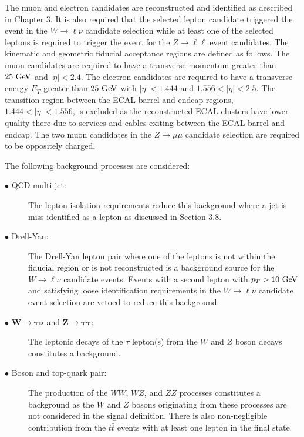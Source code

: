 The muon and electron candidates are reconstructed and identified as described in Chapter 3. It is also required that the selected lepton candidate triggered the event in the $W\rightarrow \ell\nu$ candidate selection while at least one of the selected leptons is required to trigger the event for the $Z\rightarrow \ell\ell$ event candidates. The kinematic and geometric fiducial acceptance regions are defined as follows. The muon candidates are required to have a transverse momentum greater than $25~\mathrm{Ge\kern -0.1em V}$ and $|\eta|<2.4$. The electron candidates are required to have a transverse energy $E_{T}$ greater than $25~\mathrm{Ge\kern -0.1em V}$ with $|\eta|<1.444$ and $1.556<|\eta|<2.5$.  The transition region between the ECAL barrel and endcap regions, $1.444<|\eta|<1.556$, is excluded as the reconstructed ECAL clusters have lower quality there due to services and cables exiting between the ECAL barrel and endcap. The two muon candidates in the  $Z\rightarrow \mu\mu$ candidate selection are required to be oppositely charged.

The following background processes are considered:
\begin{description}
\item[$\bullet$ QCD multi-jet:] The lepton isolation requirements reduce this background where a jet is miss-identified as a lepton as discussed in Section 3.8.  
\item[$\bullet$ Drell-Yan:] The Drell-Yan lepton pair where one of the leptons is not within the fiducial region or is not reconstructed is a background source for the $W \rightarrow \ell\nu$ candidate events. Events with a second lepton with $p_{T}>10~\mathrm{Ge\kern -0.1em V}$ and satisfying loose identification requirements in the $W \rightarrow \ell\nu$ candidate event selection are vetoed to reduce this background. 
\item[$\bullet$ $\boldsymbol{W\rightarrow \tau\nu}$ and $\boldsymbol{Z\rightarrow \tau\tau}$:] The leptonic decays of the $\tau$ lepton(s) from the $W$ and $Z$ boson decays constitutes a background. 
\item[$\bullet$ Boson and top-quark pair:] The production of the $WW$, $WZ$, and $ZZ$ processes constitutes a background as the $W$ and $Z$ bosons originating from these processes are not considered in the signal definition. There is also non-negligible contribution from the $t\bar{t}$ events with at least one lepton in the final state.
\end{description}    

